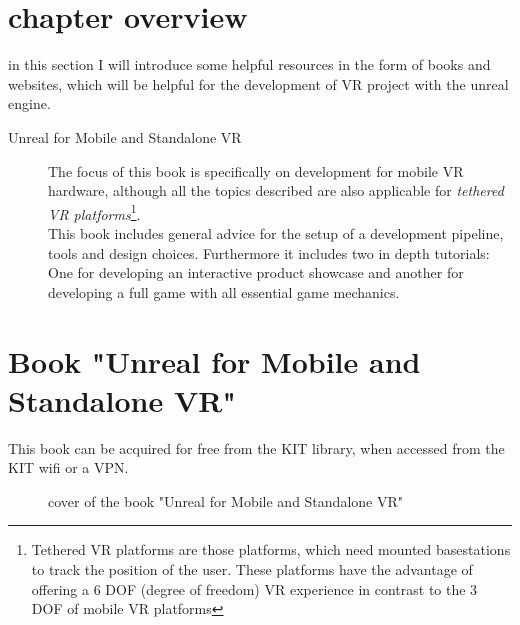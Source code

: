 \section{chapter overview}

in this section I will introduce some helpful resources in the form of books and websites, which will be helpful for the development of VR project with the unreal engine.


\begin{description}
\item[Unreal for Mobile and Standalone VR] The focus of this book is specifically on development for mobile VR hardware, although all the topics described are also applicable for \textit{tethered VR platforms}\footnote{Tethered VR platforms are those platforms, which need mounted basestations to track the position of the user. These platforms have the advantage of offering a 6 DOF (degree of freedom) VR experience in contrast to the 3 DOF of mobile VR  platforms}.\\
This book includes general advice for the setup of a development pipeline, tools and design choices. Furthermore it includes two in depth tutorials: One for developing an interactive product showcase and another for developing a full game with all essential game mechanics.
\end{description}

\section{Book "Unreal for Mobile and Standalone VR"}

This book can be acquired for free from the KIT library\cite{KitBib}, when accessed from the KIT wifi or a VPN.

\setlength{\fboxsep}{0pt}
\setlength{\fboxrule}{0pt}
\begin{figure}[h]
\centering
{}
\caption[Unreal for Mobile and Standalone VR]{cover of the book "Unreal for Mobile and Standalone VR"}
\label{fig:unrealgoodspecs}
\end{figure}
